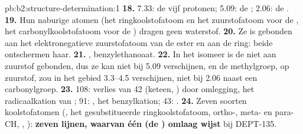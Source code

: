 \begin{solution}{pb:b2:structure-determination:1}
\textbf{18.} 7.33: de vijf  protonen; 5.09: de ; 2.06: de .
\textbf{19.} Hun naburige atomen (het ringkoolstofatoom en het zuurstofatoom voor de , het carbonylkoolstofatoom
voor de ) dragen geen waterstof.
\textbf{20.} Ze is gebonden aan het elektronegatieve zuurstofatoom van de ester en aan de ring: beide ontschermen haar.
\textbf{21.} , benzylethanoaat.
\textbf{22.} In het isomeer is de  niet aan zuurstof gebonden, dus ze kan niet bij 5.09 verschijnen, en de
methylgroep, op zuurstof, zou in het gebied 3.3--4.5 verschijnen, niet bij 2.06 naast een carbonylgroep.
\textbf{23.} 108: verlies van 42 (keteen, ) door omlegging, het radicaalkation van
; 91: , het benzylkation; 43: .
\textbf{24.} Zeven soorten koolstofatomen (, het gesubstitueerde ringkoolstofatoom, ortho-, meta- en para-CH,
, ): \textbf{zeven lijnen, waarvan één (de ) omlaag wijst} bij DEPT-135.
\end{solution}
